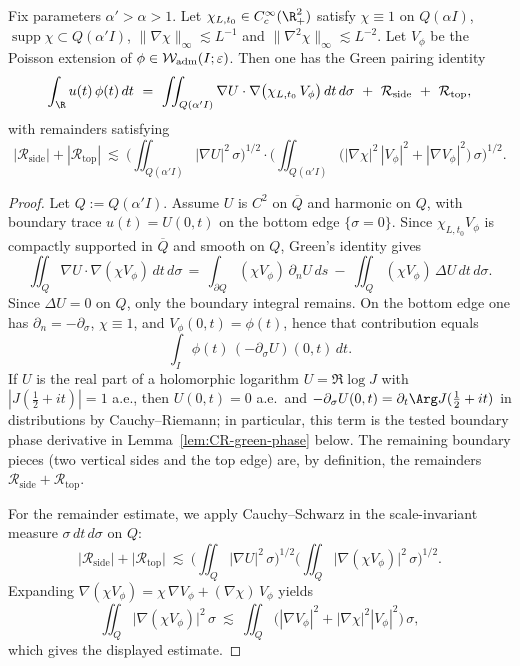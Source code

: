 \begin{lemma}\label{lem:cutoff-pairing}
Fix parameters \(\alpha'>\alpha>1\).
Let \(\chi_{L,t_0}\in C_c^\infty(\R^2_+)\) satisfy \(\chi\equiv1\) on \(Q(\alpha I)\), \(\operatorname{supp}\chi\subset Q(\alpha'I)\), \(\|\nabla\chi\|_\infty\lesssim L^{-1}\) and \(\|\nabla^2\chi\|_\infty\lesssim L^{-2}\).
Let \(V_\phi\) be the Poisson extension of \(\phi\in \mathcal W_{\rm adm}(I;\varepsilon)\).
Then one has the Green pairing identity
\[
 \int_{\R} u(t)\,\phi(t)\,dt
 \ =\ \iint_{Q(\alpha'I)} \nabla U\cdot \nabla\big(\chi_{L,t_0}\, V_\phi\big)\,dt\,d\sigma\ +\ \mathcal R_{\mathrm{side}}\ +\ \mathcal R_{\mathrm{top}},
\]
with remainders satisfying
\[
 |\mathcal R_{\mathrm{side}}|+|\mathcal R_{\mathrm{top}}|
 \ \lesssim\ \Big(\iint_{Q(\alpha'I)} |\nabla U|^2\,\sigma\Big)^{1/2}
               \cdot \Big(\iint_{Q(\alpha'I)} \big(|\nabla\chi|^2\,|V_\phi|^2+|\nabla V_\phi|^2\big)\,\sigma\Big)^{1/2}.
\]
\end{lemma}
\begin{proof}
Let \(Q:=Q(\alpha'I)\).
Assume \(U\) is \(C^2\) on \(\overline Q\) and harmonic on \(Q\), with boundary trace \(u(t)=U(0,t)\) on the bottom edge \(\{\sigma=0\}\).
Since \(\chi_{L,t_0}V_\phi\) is compactly supported in \(\overline Q\) and smooth on \(Q\), Green's identity gives
\[
  \iint_{Q} \nabla U\cdot \nabla(\chi V_\phi)\,dt\,d\sigma
  \,=\,
  \int_{\partial Q} (\chi V_\phi)\,\partial_n U\,ds
  \ -\ \iint_{Q} (\chi V_\phi)\,\Delta U\,dt\,d\sigma.
\]
Since \(\Delta U=0\) on \(Q\), only the boundary integral remains.
On the bottom edge one has \(\partial_n=-\partial_\sigma\), \(\chi\equiv1\), and \(V_\phi(0,t)=\phi(t)\), hence that contribution equals
\[
  \int_{I} \phi(t)\,(-\partial_\sigma U)(0,t)\,dt.
\]
If \(U\) is the real part of a holomorphic logarithm \(U=\Re\log J\) with \(|J(\tfrac12+it)|=1\) a.e., then \(U(0,t)=0\) a.e.\ and \(-\partial_\sigma U(0,t)=\partial_t \Arg J(\tfrac12+it)\) in distributions by Cauchy--Riemann; in particular, this term is the tested boundary phase derivative in Lemma~\ref{lem:CR-green-phase} below.
The remaining boundary pieces (two vertical sides and the top edge) are, by definition, the remainders \(\mathcal R_{\mathrm{side}}+\mathcal R_{\mathrm{top}}\).

For the remainder estimate, we apply Cauchy--Schwarz in the scale-invariant measure \(\sigma\,dt\,d\sigma\) on \(Q\):
\[
  \big|\mathcal R_{\mathrm{side}}\big|+\big|\mathcal R_{\mathrm{top}}\big|
  \ \lesssim\ \Big(\iint_Q |\nabla U|^2\,\sigma\Big)^{1/2}
               \Big(\iint_Q \big|\nabla(\chi V_\phi)\big|^2\,\sigma\Big)^{1/2}.
\]
Expanding \(\nabla(\chi V_\phi)=\chi\,\nabla V_\phi + (\nabla\chi)\,V_\phi\) yields
\[
  \iint_Q \big|\nabla(\chi V_\phi)\big|^2\,\sigma
  \ \lesssim\ \iint_Q \big(|\nabla V_\phi|^2 + |\nabla\chi|^2|V_\phi|^2\big)\,\sigma,
\]
which gives the displayed estimate.
\end{proof}

